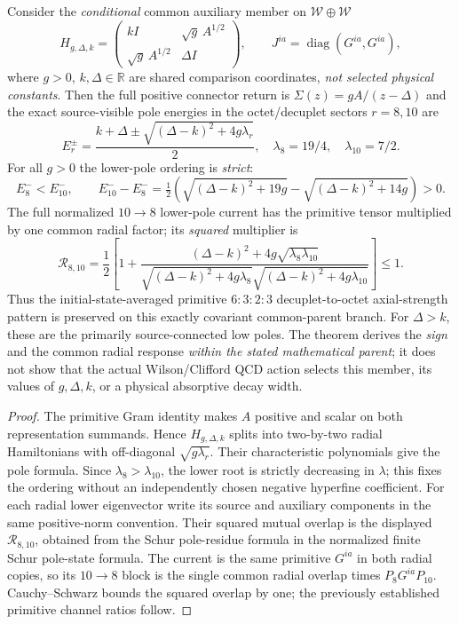 \documentclass[12pt,a4paper]{article}
\begin{document}
\begin{theorem}
\label{p11:thm:v377-conditional-positive-gram-ordering}
Consider the \emph{conditional} common auxiliary member on
$\mathcal W\oplus\mathcal W$
\[
H_{g,\Delta,k}=\begin{pmatrix}
 kI&\sqrt g\,A^{1/2}\\
 \sqrt g\,A^{1/2}&\Delta I
\end{pmatrix},\qquad
J^{ia}=\operatorname{diag}(G^{ia},G^{ia}),
\]
where $g>0$, $k,\Delta\in\mathbb R$ are shared comparison
coordinates, \emph{not selected physical constants}. Then the
full positive connector return is
$\Sigma(z)=gA/(z-\Delta)$ and the exact source-visible pole
energies in the octet/decuplet sectors $r=8,10$ are
\[
 \boxed{E_r^{\pm}=\frac{k+\Delta\pm
 \sqrt{(\Delta-k)^2+4g\lambda_r}}2,
 \quad \lambda_8=19/4,\quad\lambda_{10}=7/2.}
\]
For all $g>0$ the lower-pole ordering is \emph{strict}:
\[
 \boxed{E_8^-<E_{10}^-,\qquad
 E_{10}^--E_8^-
 =\tfrac12\!\left(\sqrt{(\Delta-k)^2+19g}
 -\sqrt{(\Delta-k)^2+14g}\right)>0.}
\]
The full normalized $10\to8$ lower-pole current has the
primitive tensor multiplied by one common radial factor; its
\emph{squared} multiplier is
\[
 \boxed{\mathcal R_{8,10}
 =\frac12\left[1+
 \frac{(\Delta-k)^2+4g\sqrt{\lambda_8\lambda_{10}}}
 {\sqrt{(\Delta-k)^2+4g\lambda_8}
 \sqrt{(\Delta-k)^2+4g\lambda_{10}}}\right]\le1.}
\]
Thus the initial-state-averaged primitive
$6:3:2:3$ decuplet-to-octet axial-strength pattern is preserved
on this exactly covariant common-parent branch. For $\Delta>k$,
these are the primarily source-connected low poles.
The theorem derives the \emph{sign} and the common radial response
\emph{within the stated mathematical parent}; it does not show
that the actual Wilson/Clifford QCD action selects this member,
its values of $g,\Delta,k$, or a physical absorptive decay width.
\end{theorem}
\begin{proof}
The primitive Gram identity makes $A$ positive and scalar on
both representation summands. Hence $H_{g,\Delta,k}$ splits
into two-by-two radial Hamiltonians with off-diagonal
$\sqrt{g\lambda_r}$. Their characteristic polynomials give the
pole formula. Since $\lambda_8>\lambda_{10}$, the lower root
is strictly decreasing in $\lambda$; this fixes the ordering
without an independently chosen negative hyperfine coefficient.
For each radial lower eigenvector write its source and auxiliary
components in the same positive-norm convention. Their squared
mutual overlap is the displayed $\mathcal R_{8,10}$, obtained
from the Schur pole-residue formula in
the normalized finite Schur pole-state formula.
The current is the same primitive $G^{ia}$ in both radial copies,
so its $10\to8$ block is the single common radial overlap times
$P_8G^{ia}P_{10}$. Cauchy--Schwarz bounds the squared overlap by
one; the previously established primitive channel ratios follow.
\end{proof}
\end{document}
